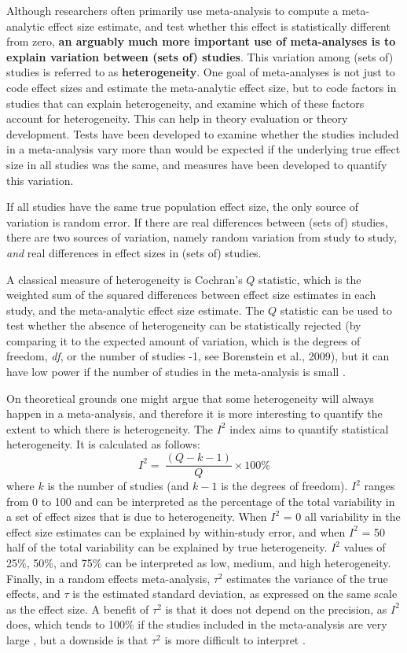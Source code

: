 \documentclass[
  oneside]{book}
\begin{document}
Although researchers often primarily use meta-analysis to compute a meta-analytic effect size estimate, and test whether this effect is statistically different from zero, \textbf{an arguably much more important use of meta-analyses is to explain variation between (sets of) studies}. This variation among (sets of) studies is referred to as \textbf{heterogeneity}. One goal of meta-analyses is not just to code effect sizes and estimate the meta-analytic effect size, but to code factors in studies that can explain heterogeneity, and examine which of these factors account for heterogeneity. This can help in theory evaluation or theory development. Tests have been developed to examine whether the studies included in a meta-analysis vary more than would be expected if the underlying true effect size in all studies was the same, and measures have been developed to quantify this variation.

If all studies have the same true population effect size, the only source of variation is random error. If there are real differences between (sets of) studies, there are two sources of variation, namely random variation from study to study, \emph{and} real differences in effect sizes in (sets of) studies.

A classical measure of heterogeneity is Cochran's \(Q\) statistic, which is the weighted sum of the squared differences between effect size estimates in each study, and the meta-analytic effect size estimate. The \(Q\) statistic can be used to test whether the absence of heterogeneity can be statistically rejected (by comparing it to the expected amount of variation, which is the degrees of freedom, \emph{df}, or the number of studies -1, see Borenstein et al., 2009), but it can have low power if the number of studies in the meta-analysis is small \citep{huedo-medina_assessing_2006}.

On theoretical grounds one might argue that some heterogeneity will always happen in a meta-analysis, and therefore it is more interesting to quantify the extent to which there is heterogeneity. The \(I^2\) index aims to quantify statistical heterogeneity. It is calculated as follows: \[I^{2} = \ \frac{(Q - k - 1)}{Q} \times 100\%\] where \(k\) is the number of studies (and \(k-1\) is the degrees of freedom). \(I^2\) ranges from 0 to 100 and can be interpreted as the percentage of the total variability in a set of effect sizes that is due to heterogeneity. When \(I^2\) = 0 all variability in the effect size estimates can be explained by within-study error, and when \(I^2\) = 50 half of the total variability can be explained by true heterogeneity. \(I^2\) values of 25\%, 50\%, and 75\% can be interpreted as low, medium, and high heterogeneity. Finally, in a random effects meta-analysis, \(\tau^2\) estimates the variance of the true effects, and \(\tau\) is the estimated standard deviation, as expressed on the same scale as the effect size. A benefit of \(\tau^2\) is that it does not depend on the precision, as \(I^2\) does, which tends to 100\% if the studies included in the meta-analysis are very large \citep{rucker_undue_2008}, but a downside is that \(\tau^2\) is more difficult to interpret \citep{harrer_doing_2021}.
\end{document}
